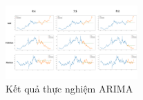 \begin{figure}[H]
\centerline{\includegraphics[width=0.45\textwidth]{img/Arima_result.png}}
\caption{Kết quả thực nghiệm ARIMA}
\label{fig}
\end{figure}